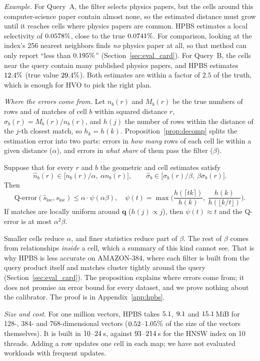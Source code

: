 \documentclass[sigconf,nonacm]{acmart}
\newcommand{\sloc}{s_{\text{loc}}}
\begin{document}
\emph{Example.} For Query~A, the filter selects physics papers, but the cells around this computer-science paper contain almost none, so the estimated distance must grow until it reaches cells where physics papers are common. HPBS estimates a local selectivity of $0.0578\%$, close to the true $0.0741\%$. For comparison, looking at the index's 256 nearest neighbors finds \emph{no} physics paper at all, so that method can only report ``less than $0.195\%$'' (Section~\ref{sec:eval_card}). For Query~B, the cells near the query contain many published physics papers, and HPBS estimates $12.4\%$ (true value $29.4\%$). Both estimates are within a factor of $2.5$ of the truth, which is enough for HVO to pick the right plan.

\emph{Where the errors come from.} Let $n_b(r)$ and $M_b(r)$ be the true numbers of rows and of matches of cell $b$ within squared distance $r$, $\sigma_b(r)=M_b(r)/n_b(r)$, and $h(j)$ the number of rows within the distance of the $j$-th closest match, so $h_k=h(k)$. Proposition~\ref{prop:decomp} splits the estimation error into two parts: errors in \emph{how many} rows of each cell lie within a given distance ($\alpha$), and errors in \emph{what share} of them pass the filter ($\beta$).
\begin{proposition}\label{prop:decomp}
Suppose that for every $r$ and $b$ the geometric and cell estimates satisfy
\[
\hat n_b(r)\in\big[n_b(r)/\alpha,\ \alpha n_b(r)\big],\qquad \hat\sigma_b\in\big[\sigma_b(r)/\beta,\ \beta\sigma_b(r)\big].
\]
Then
\[
\text{Q-error}(\hat s_{\text{loc}}, \sloc) \le \alpha\cdot\psi(\alpha\beta), \quad \psi(t)=\max\Big(\frac{h(\lceil tk\rceil)}{h(k)},\ \frac{h(k)}{h(\lfloor k/t\rfloor)}\Big).
\]
If matches are locally uniform around $\mathbf{q}$ ($h(j)\propto j$), then $\psi(t)\approx t$ and the Q-error is at most $\alpha^2\beta$.
\end{proposition}
Smaller cells reduce $\alpha$, and finer statistics reduce part of $\beta$. The rest of $\beta$ comes from relationships \emph{inside} a cell, which a summary of this kind cannot see. That is why HPBS is less accurate on AMAZON-384, where each filter is built from the query product itself and matches cluster tightly around the query (Section~\ref{sec:eval_card}). The proposition explains where errors come from; it does not promise an error bound for every dataset, and we prove nothing about the calibrator. The proof is in Appendix~\ref{app:hpbs}.

\emph{Size and cost.} For one million vectors, HPBS takes $5.1$, $9.1$ and $15.1$\,MiB for 128-, 384- and 768-dimensional vectors ($0.52$--$1.05\%$ of the size of the vectors themselves). It is built in $10$--$24$\,s, against $93$--$214$\,s for the HNSW index on 10 threads. Adding a row updates one cell in each map; we have not evaluated workloads with frequent updates.
\end{document}

